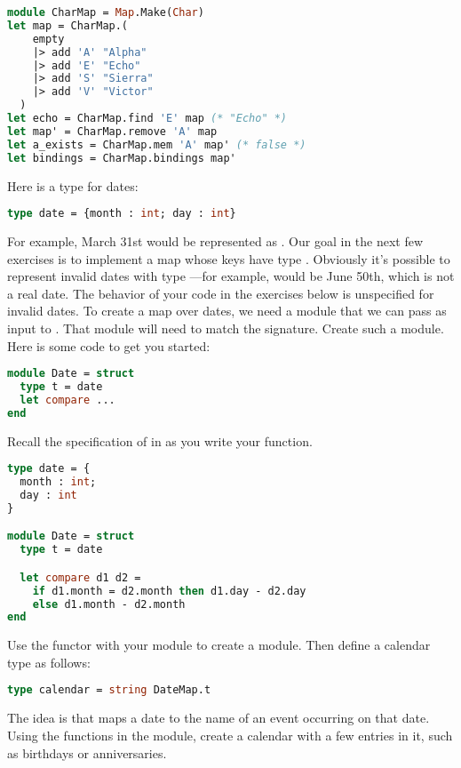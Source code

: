 \begin{lstlisting}[language=OCaml]
module CharMap = Map.Make(Char)
let map = CharMap.(
    empty
    |> add 'A' "Alpha"
    |> add 'E' "Echo"
    |> add 'S' "Sierra"
    |> add 'V' "Victor"
  )
let echo = CharMap.find 'E' map (* "Echo" *)
let map' = CharMap.remove 'A' map
let a_exists = CharMap.mem 'A' map' (* false *)
let bindings = CharMap.bindings map'
\end{lstlisting}

Here is a type for dates:
\begin{lstlisting}[language=OCaml]
type date = {month : int; day : int}
\end{lstlisting}
For example, March 31st would be represented as . Our goal in the next few exercises is to implement a map whose keys have type .
Obviously it's possible to represent invalid dates with type ---for example,  would be June 50th, which is not a real date. The behavior of your code in the exercises below is unspecified for invalid dates.
To create a map over dates, we need a module that we can pass as input to . That module will need to match the  signature. Create such a module. Here is some code to get you started:
\begin{lstlisting}[language=OCaml]
module Date = struct
  type t = date
  let compare ...
end
\end{lstlisting}
Recall the specification of  in  as you write your  function.

\begin{lstlisting}[language=OCaml]
type date = {
  month : int;
  day : int
}

module Date = struct
  type t = date

  let compare d1 d2 =
    if d1.month = d2.month then d1.day - d2.day
    else d1.month - d2.month
end
\end{lstlisting}

\problem[calendar]
Use the  functor with your  module to create a  module. Then define a calendar type as follows:
\begin{lstlisting}[language=OCaml]
type calendar = string DateMap.t
\end{lstlisting}
The idea is that  maps a date to the name of an event occurring on that date.
Using the functions in the  module, create a calendar with a few entries in it, such as birthdays or anniversaries.

